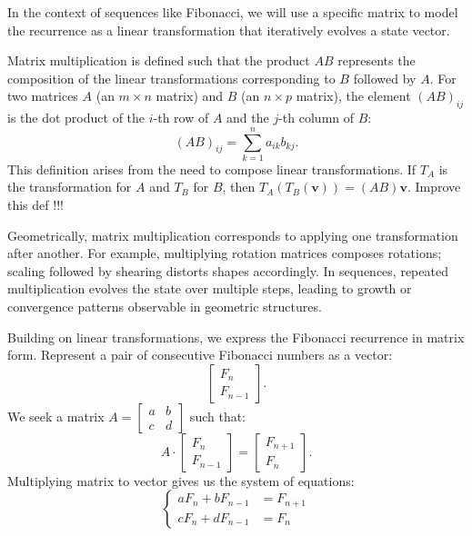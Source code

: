 \documentclass{article}
\begin{document}
In the context of sequences like Fibonacci, we will use a specific matrix to model the recurrence as a linear transformation that iteratively evolves a state vector.

Matrix multiplication is defined such that the product \( AB \) represents the composition of the linear transformations corresponding to \( B \) followed by \( A \). For two matrices \( A \) (an \( m \times n \) matrix) and \( B \) (an \( n \times p \) matrix), the element \( (AB)_{ij} \) is the dot product of the \( i \)-th row of \( A \) and the \( j \)-th column of \( B \):
\[
(AB)_{ij} = \sum_{k=1}^n a_{ik} b_{kj}.
\]
This definition arises from the need to compose linear transformations. If \( T_A \) is the transformation for \( A \) and \( T_B \) for \( B \), then \( T_A(T_B(\mathbf{v})) = (AB) \mathbf{v} \).
Improve this def !!!

Geometrically, matrix multiplication corresponds to applying one transformation after another. For example, multiplying rotation matrices composes rotations; scaling followed by shearing distorts shapes accordingly. In sequences, repeated multiplication evolves the state over multiple steps, leading to growth or convergence patterns observable in geometric structures.

Building on linear transformations, we express the Fibonacci recurrence in matrix form. Represent a pair of consecutive Fibonacci numbers as a vector:
\[
\begin{bmatrix} F_n \\ F_{n-1} \end{bmatrix}.
\]
We seek a matrix \( A = \begin{bmatrix} a & b \\ c & d \end{bmatrix} \) such that:
\[
A \cdot \begin{bmatrix} F_n \\ F_{n-1} \end{bmatrix} = \begin{bmatrix} F_{n+1} \\ F_n \end{bmatrix}.
\]
Multiplying matrix to vector gives us the system of equations:
\begin{equation}
	\left\{
	\begin{aligned}
		a F_n + b F_{n-1} &= F_{n+1}\\
		c F_n + d F_{n-1} &= F_n
	\end{aligned}
	\right.
	\label{sys_fib}
\end{equation}
\end{document}
